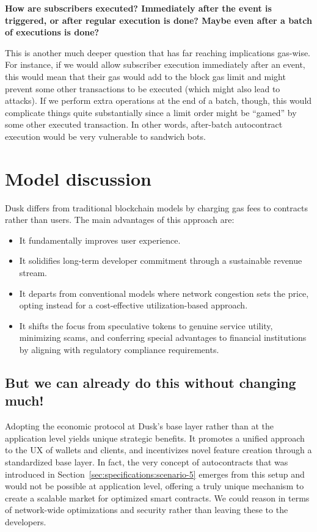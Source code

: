 \documentclass[twocolumn, nofootinbib]{revtex4-2} %
\begin{document}
    \textbf{How are subscribers executed? Immediately after the event is
    triggered, or after regular execution is done? Maybe even after a batch of
    executions is done?}

    This is another much deeper question that has far reaching implications
    gas-wise.
    For instance, if we would allow subscriber execution immediately after an
    event, this would mean that their gas would add to the block gas limit and
    might prevent some other transactions to be executed (which might also lead to
    attacks). If we perform extra operations at the end of a batch, though, this would
    complicate things quite substantially since a limit order might be
    ``gamed'' by some other executed transaction.
    In other words, after-batch autocontract execution would be very vulnerable
    to sandwich bots.

    \section{Model discussion}\label{sec:discussion}
    Dusk differs from traditional blockchain models by charging gas fees to
    contracts rather than users. The main advantages of this approach are:

    \begin{itemize}
        \item It fundamentally improves user experience.
        \item It solidifies long-term developer commitment through a sustainable
              revenue stream.
        \item It departs from conventional models where network congestion sets
              the price, opting instead for a cost-effective utilization-based
              approach.
        \item It shifts the focus from speculative tokens to genuine service
              utility, minimizing scams, and conferring special advantages to
              financial institutions by aligning with regulatory compliance
              requirements.
    \end{itemize}

    \subsection{But we can already do this without changing much!}\label{sec:discussion:but-we-can-already-do-this}
    Adopting the economic protocol at Dusk's base layer rather than at the
    application level yields unique strategic benefits.
    It promotes a unified approach to the UX of wallets and clients, and
    incentivizes novel feature creation through a standardized base layer.
    In fact, the very concept of autocontracts that was introduced in Section~\ref{sec:specifications:scenario-5} emerges
    from this setup and would not be possible at application level, offering a
    truly unique mechanism to create a scalable market for optimized smart
    contracts.
    We could reason in terms of network-wide optimizations and security rather
    than leaving these to the developers.
\end{document}
